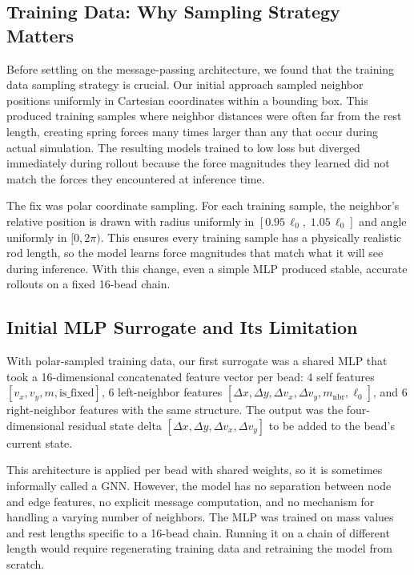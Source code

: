 \documentclass[conference]{IEEEtran}
\begin{document}
\subsection{Training Data: Why Sampling Strategy Matters}

Before settling on the message-passing architecture, we found that the training data sampling strategy is crucial. Our initial approach sampled neighbor positions uniformly in Cartesian coordinates within a bounding box. This produced training samples where neighbor distances were often far from the rest length, creating spring forces many times larger than any that occur during actual simulation. The resulting models trained to low loss but diverged immediately during rollout because the force magnitudes they learned did not match the forces they encountered at inference time.

The fix was polar coordinate sampling. For each training sample, the neighbor's relative position is drawn with radius uniformly in $[0.95\,\ell_0,\; 1.05\,\ell_0]$ and angle uniformly in $[0, 2\pi)$. This ensures every training sample has a physically realistic rod length, so the model learns force magnitudes that match what it will see during inference. With this change, even a simple MLP produced stable, accurate rollouts on a fixed 16-bead chain.

\subsection{Initial MLP Surrogate and Its Limitation}

With polar-sampled training data, our first surrogate was a shared MLP that took a 16-dimensional concatenated feature vector per bead: 4 self features $[v_x, v_y, m, \text{is\_fixed}]$, 6 left-neighbor features $[\Delta x, \Delta y, \Delta v_x, \Delta v_y, m_{\text{nbr}}, \ell_0]$, and 6 right-neighbor features with the same structure. The output was the four-dimensional residual state delta $[\Delta x, \Delta y, \Delta v_x, \Delta v_y]$ to be added to the bead's current state.

This architecture is applied per bead with shared weights, so it is sometimes informally called a GNN. However, the model has no separation between node and edge features, no explicit message computation, and no mechanism for handling a varying number of neighbors. The MLP was trained on mass values and rest lengths specific to a 16-bead chain. Running it on a chain of different length would require regenerating training data and retraining the model from scratch.
\end{document}
